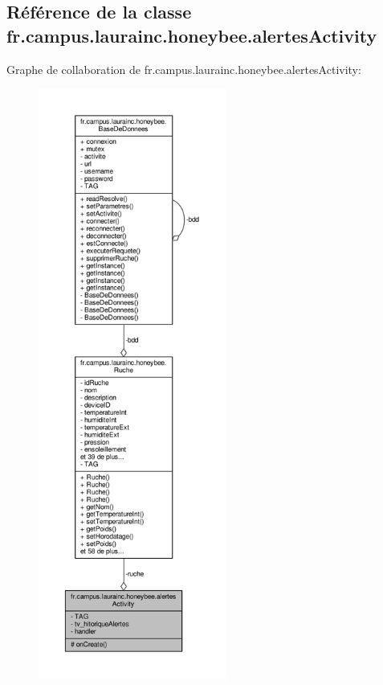 \hypertarget{classfr_1_1campus_1_1laurainc_1_1honeybee_1_1alertes_activity}{}\subsection{Référence de la classe fr.\+campus.\+laurainc.\+honeybee.\+alertes\+Activity}
\label{classfr_1_1campus_1_1laurainc_1_1honeybee_1_1alertes_activity}


Graphe de collaboration de fr.\+campus.\+laurainc.\+honeybee.\+alertes\+Activity\+:\nopagebreak
\begin{figure}[H]
\begin{center}
\leavevmode
\includegraphics[height=550pt]{classfr_1_1campus_1_1laurainc_1_1honeybee_1_1alertes_activity__coll__graph}
\end{center}
\end{figure}
